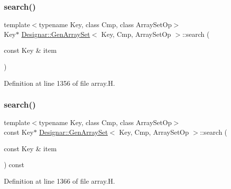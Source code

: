 \subsubsection{\texorpdfstring{search()}{search()}\hspace{0.1cm}{\footnotesize\ttfamily [1/2]}}
{\footnotesize\ttfamily template$<$typename Key, class Cmp, class Array\+Set\+Op$>$ \\
Key$\ast$ \hyperlink{class_designar_1_1_gen_array_set}{Designar\+::\+Gen\+Array\+Set}$<$ Key, Cmp, Array\+Set\+Op $>$\+::search (\begin{DoxyParamCaption}\item[{const Key \&}]{item }\end{DoxyParamCaption})\hspace{0.3cm}{\ttfamily [inline]}}



Definition at line 1356 of file array.\+H.

\mbox{\label{class_designar_1_1_gen_array_set_adbe26651c80bbcc92afe2563f6bcefc3}} 
\subsubsection{\texorpdfstring{search()}{search()}\hspace{0.1cm}{\footnotesize\ttfamily [2/2]}}
{\footnotesize\ttfamily template$<$typename Key, class Cmp, class Array\+Set\+Op$>$ \\
const Key$\ast$ \hyperlink{class_designar_1_1_gen_array_set}{Designar\+::\+Gen\+Array\+Set}$<$ Key, Cmp, Array\+Set\+Op $>$\+::search (\begin{DoxyParamCaption}\item[{const Key \&}]{item }\end{DoxyParamCaption}) const\hspace{0.3cm}{\ttfamily [inline]}}



Definition at line 1366 of file array.\+H.

\mbox{\label{class_designar_1_1_gen_array_set_ab5b56f597b39e2dbf03514a2eb096e8a}} 
